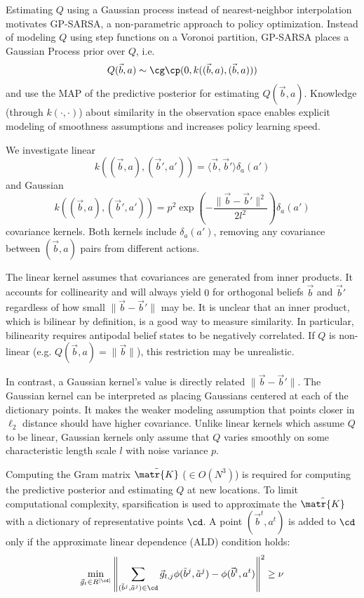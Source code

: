 \documentclass[a4paper,oneside,reqno]{amsart}
\begin{document}
Estimating $Q$ using a Gaussian process instead of nearest-neighbor
interpolation motivates GP-SARSA, a non-parametric approach to policy
optimization. Instead of modeling $Q$ using step functions on a Voronoi
partition, GP-SARSA\cite{engel2005reinforcement} places a Gaussian Process
prior over $Q$, i.e.
\[
  Q(\vec{b},a) \sim \cg\cp(0, k((\vec{b},a),(\vec{b},a)))
\]
and use the MAP of the predictive posterior for estimating $Q(\vec{b},a)$.
Knowledge (through $k(\cdot,\cdot)$) about similarity in the observation space
enables explicit modeling of smoothness assumptions and increases policy
learning speed.

We investigate linear
\begin{equation}
  \label{eq:linear}
  k((\vec{b},a),(\vec{b}',a')) = \langle \vec{b}, \vec{b}'\rangle \delta_a(a')
\end{equation}
and Gaussian
\begin{equation}
  \label{eq:gaussian}
  k((\vec{b},a),(\vec{b}',a')) = p^2 \exp\left( -\frac{\|\vec{b} - \vec{b}'\|^2}{2l^2} \right) \delta_a(a')
\end{equation}
covariance kernels. Both kernels include $\delta_a(a')$, removing any
covariance between $(\vec{b},a)$ pairs from different actions.


The linear kernel assumes that covariances are generated from inner products.
It accounts for collinearity and will always yield $0$ for orthogonal beliefs
$\vec{b}$ and $\vec{b}'$ regardless of how small $\|\vec{b} - \vec{b}'\|$ may
be.  It is unclear that an inner product, which is bilinear by definition, is a
good way to measure similarity. In particular, bilinearity requires antipodal
belief states to be negatively correlated. If $Q$ is non-linear (e.g.
$Q(\vec{b},a) = \|\vec{b}\|$), this restriction may be unrealistic.

In contrast, a Gaussian kernel's value is directly related $\|\vec{b} -
\vec{b}'\|$.  The Gaussian kernel can be interpreted as placing Gaussians
centered at each of the dictionary points. It makes the weaker modeling
assumption that points closer in $\ell_2$ distance should have higher
covariance. Unlike linear kernels which assume $Q$ to be linear, Gaussian
kernels only assume that $Q$ varies smoothly on some characteristic length
scale $l$ with noise variance $p$.

Computing the Gram matrix $\tilde{\matr{K}}$ ($\in O(N^3)$) is required for
computing the predictive posterior and estimating $Q$ at new locations. To
limit computational complexity, sparsification is used to approximate the
$\tilde{\matr{K}}$ with a dictionary of representative points $\cd$. A point
$(\vec{b}^t, a^t)$ is added to $\cd$ only if the approximate linear dependence
(ALD) condition holds:
\begin{equation}
  \label{eq:ald}
  \min_{\vec{g}_t \in \\R^{|\cd|}}
  \left\|
  \sum_{(\tilde{b}^j,\tilde{a}^j) \in \cd} \vec{g}_{t,j} \phi(\tilde{b}^j, \tilde{a}^j) - \phi(\vec{b}^t, a^t)
  \right\|^2
  \geq \nu
\end{equation}
\end{document}
